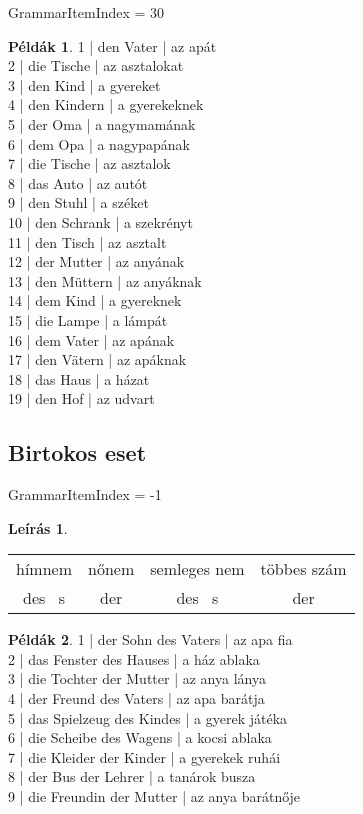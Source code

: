 \documentclass{article}
\theoremstyle{definition}
\newtheorem*{exmp}{Példák}
\newtheorem*{desc}{Leírás}
\begin{document}
GrammarItemIndex = 30

\begin{exmp}	%
1 | den Vater | az apát\\
2 | die Tische | az asztalokat\\
3 | den Kind | a gyereket\\
4 | den Kindern | a gyerekeknek\\
5 | der Oma | a nagymamának\\
6 | dem Opa | a nagypapának\\
7 | die Tische | az asztalok\\
8 | das Auto | az autót\\
9 | den Stuhl | a széket\\
10 | den Schrank | a szekrényt\\
11 | den Tisch | az asztalt\\
12 | der Mutter | az anyának\\
13 | den Müttern | az anyáknak\\
14 | dem Kind | a gyereknek\\
15 | die Lampe | a lámpát\\
16 | dem Vater | az apának\\
17 | den Vätern | az apáknak\\
18 | das Haus | a házat\\
19 | den Hof | az udvart\\
\end{exmp}

\subsection{Birtokos eset}

GrammarItemIndex = -1

\begin{desc}
\begin{tabular}{cccc}
hímnem & nőnem & semleges nem & többes szám\\
des ~s & der & des ~s & der\\
\end{tabular}
\end{desc}

\begin{exmp}
1 | der Sohn des Vaters | az apa fia\\
2 | das Fenster des Hauses | a ház ablaka\\
3 | die Tochter der Mutter | az anya lánya\\
4 | der Freund des Vaters | az apa barátja\\
5 | das Spielzeug des Kindes | a gyerek játéka\\
6 | die Scheibe des Wagens | a kocsi ablaka\\
7 | die Kleider der Kinder | a gyerekek ruhái\\
8 | der Bus der Lehrer | a tanárok busza\\
9 | die Freundin der Mutter | az anya barátnője\\
\end{exmp}
\end{document}
